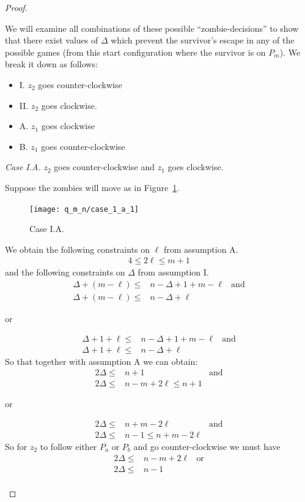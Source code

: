 \begin{proof}
\begin{proofpart}
  We will examine all combinations of these possible ``zombie-decisions'' to show that there exist values of $\Delta$ which prevent the survivor's escape in any of the possible games (from this start configuration where the survivor is on $P_m$). We break it down as follows:

  \begin{itemize}
   \item I. $z_2$ goes counter-clockwise
   \item II. $z_2$ goes clockwise.
   \item A. $z_1$ goes clockwise
   \item B. $z_1$ goes counter-clockwise
  \end{itemize}

  \textit{Case I.A.} $z_2$ goes counter-clockwise and $z_1$ goes clockwise.

  Suppose the zombies will move as in Figure~\ref{fig:case_1_a_1}.
  \begin{figure}
    \centering
    \texttt{[image: q\_m\_n/case\_1\_a\_1]}
    \caption{Case I.A. \label{fig:case_1_a_1}}
  \end{figure}

  We obtain the following constraints on $\ell$ from assumption A.
  \begin{align*}
   4 \leq 2 \ell \leq m + 1
  \end{align*}
  and the following constraints on $\Delta$ from assumption I.
  \begin{align*}
   \Delta + (m - \ell) \leq & n - \Delta + 1 + m - \ell & \text{and} \\
   \Delta + (m - \ell) \leq & n - \Delta + \ell
  \end{align*}
  \begin{center}or\end{center}
  \begin{align*}
   \Delta + 1 + \ell \leq & n - \Delta + 1 + m - \ell & \text{and} \\
   \Delta + 1 + \ell \leq & n - \Delta + \ell
  \end{align*}
  So that together with assumption A we can obtain:
  \begin{align*}
   2 \Delta \leq & n+1                    & \text{and} \\
   2 \Delta \leq & n - m + 2\ell \leq n+1
  \end{align*}
  \begin{center}or\end{center}
  \begin{align*}
   2 \Delta \leq & n+m -2 \ell             & \text{and} \\
   2 \Delta \leq & n -1 \leq n + m - 2\ell
  \end{align*}
  So for $z_2$ to follow either $P_a$ or $P_b$ and go counter-clockwise we must have
  \begin{align*}
   2 \Delta \leq & n - m + 2\ell & \text{or} \\
   2 \Delta \leq & n - 1                     \\
  \end{align*}


\end{proofpart}
\end{proof}
